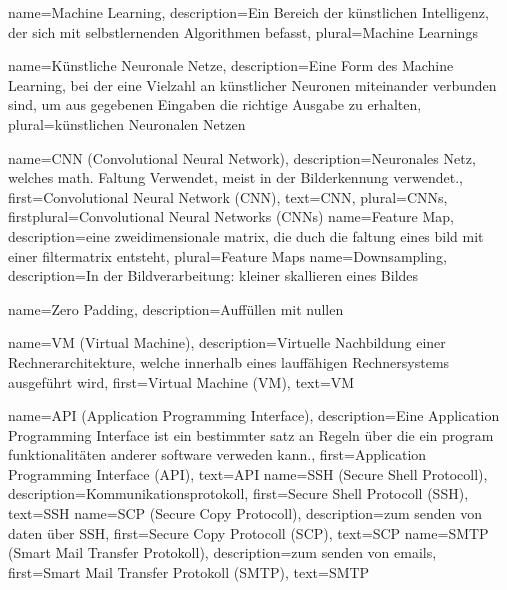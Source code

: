 
{
    name={Machine Learning},
    description={Ein Bereich der künstlichen
    Intelligenz, der sich mit selbstlernenden 
    Algorithmen befasst},
    plural={Machine Learnings}
}

{
    name={Künstliche Neuronale Netze},
    description={Eine Form des Machine Learning, bei der 
    eine Vielzahl an künstlicher Neuronen miteinander 
    verbunden sind, um aus gegebenen Eingaben 
    die richtige Ausgabe zu erhalten},
    plural={künstlichen Neuronalen Netzen}
}

{
    name={CNN (Convolutional Neural Network)},
    description={Neuronales Netz, welches math. Faltung 
    Verwendet, meist in der Bilderkennung verwendet.},
    first={Convolutional Neural Network (CNN)},
    text={CNN},
    plural={CNNs},
    firstplural={Convolutional Neural Networks (CNNs)}
}
{
    name={Feature Map},
    description={eine zweidimensionale matrix, 
    die duch die faltung eines bild mit einer 
    filtermatrix entsteht},
    plural={Feature Maps}
}
{
    name={Downsampling},
    description={In der Bildverarbeitung: kleiner skallieren 
    eines Bildes}
}

{
    name={Zero Padding},
    description={Auffüllen mit nullen}
}



{
    name={VM (Virtual Machine)},
    description={Virtuelle Nachbildung einer Rechnerarchitekture, 
    welche innerhalb eines lauffähigen Rechnersystems ausgeführt wird},
    first={Virtual Machine (VM)},
    text={VM}
}

{
    name={API (Application Programming Interface)},
    description={Eine Application Programming Interface
    ist ein bestimmter satz an Regeln
    über die ein program funktionalitäten anderer software verweden kann.},
    first={Application Programming Interface (API)},
    text={API}
}
{
    name={SSH (Secure Shell Protocoll)},
    description={Kommunikationsprotokoll},
    first={Secure Shell Protocoll (SSH)},
    text={SSH}
}
{
    name={SCP (Secure Copy Protocoll)},
    description={zum senden von daten über SSH},
    first={Secure Copy Protocoll (SCP)},
    text={SCP}
}
{
    name={SMTP (Smart Mail Transfer Protokoll)},
    description={zum senden von emails},
    first={Smart Mail Transfer Protokoll (SMTP)},
    text={SMTP}
}


